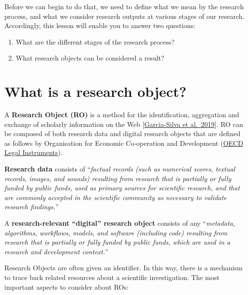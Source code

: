 \documentclass[
  letterpaper,
  DIV=11,
  numbers=noendperiod]{scrreport}
\providecommand{\tightlist}{%
  \setlength{\itemsep}{0pt}\setlength{\parskip}{0pt}}\usepackage{longtable,booktabs,array}
\begin{document}
Before we can begin to do that, we need to define what we mean by the
research process, and what we consider research outputs at various
stages of our research. Accordingly, this lesson will enable you to
answer two questions:

\begin{enumerate}
\def\labelenumi{\arabic{enumi}.}
\tightlist
\item
  What are the different stages of the research process?
\item
  What research objects can be considered a result?
\end{enumerate}

\hypertarget{what-is-a-research-object}{%
\section{What is a research object?}\label{what-is-a-research-object}}

A \textbf{Research Object (RO)} is a method for the identification,
aggregation and exchange of scholarly information on the Web
{[}\href{https://www.sciencedirect.com/science/article/abs/pii/S0167739X18314638}{Garcia-Silva
et al.~2019}{]}. RO can be composed of both research data and digital
research objects that are defined as follows by Organisation for
Economic Co-operation and Development
(\href{https://legalinstruments.oecd.org/en/instruments/OECD-LEGAL-0347}{OECD
Legal Instruments}).

\textbf{Research data} consists of ``\emph{factual records (such as
numerical scores, textual records, images, and sounds) resulting from
research that is partially or fully funded by public funds, used as
primary sources for scientific research, and that are commonly accepted
in the scientific community as necessary to validate research
findings.}''

A \textbf{research-relevant ``digital'' research object} consists of any
``\emph{metadata, algorithms, workflows, models, and software (including
code) resulting from research that is partially or fully funded by
public funds, which are used in a research and development context.}''

Research Objects are often given an identifier. In this way, there is a
mechanism to trace back related resources about a scientific
investigation. The most important aspects to consider about ROs:
\end{document}
